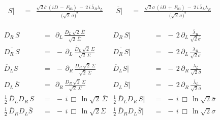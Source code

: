 \documentclass[14pt]{article}
\newcommand{\p}{\partial}
\newcommand{\ov}{\overline}
\begin{document}
\begin{align*}
	S \Big| &    ~~=~~    \frac{ \sqrt{2}\ov\sigma\, ( iD \,-\, F_{03} ) ~-~ 2\,i\, \ov\lambda{}_R \lambda_L }
						{ \big( \sqrt{2}\, \ov\sigma \big)^2 }
	\quad
	&
	\ov S \Big| &    ~~=~~    \frac{ \sqrt{2}\sigma\, ( iD \,+\, F_{03} ) ~-~ 2\,i\, \ov\lambda{}_L \lambda_R }
						{ \big( \sqrt{2}\, \sigma \big)^2 }
\end{align*}

\begin{align*}
%
	D_R\, S &    ~~=~~    \p_L\, \frac{ D_L\, \sqrt{2}\,\ov\Sigma}{\sqrt{2}\,\ov\Sigma}
	&
	D_R\, S \Big| &    ~~=~~    -\, 2\, \p_L\, \frac{\ov\lambda{}_R}{\sqrt{2}\ov\sigma}
	\\[2mm]
%
	\ov {D_R\, S} &    ~~=~~    -\, \p_L\, \frac{\ov D{}_L\, \sqrt{2}\,\Sigma}{\sqrt{2}\, \Sigma}
	&
	\ov {D_R\, S} \Big| &    ~~=~~    -\, 2\, \p_L\, \frac{\lambda_R}{\sqrt{2}\sigma}
	\\[2mm]
%
	\ov D{}_L S &    ~~=~~    -\, \p_R\, \frac{ \ov{D_R\, \sqrt{2}\, \Sigma} }{ \sqrt{2}\, \ov\Sigma }
	&
	\ov D{}_L S \Big| &    ~~=~~    -\, 2\, \p_R\, \frac{\lambda_L}{\sqrt{2}\ov\sigma}
	\\[2mm]
%
	D_L\, \ov S &    ~~=~~    \p_R\, \frac{D_R\, \sqrt{2}\, \Sigma}{\sqrt{2}\,\Sigma}
	&
	D_L\, \ov S \Big| &    ~~=~~    -\, 2\, \p_R\, \frac{\ov\lambda{}_L}{\sqrt{2}\sigma}
	\\[6mm]
%
	\frac{1}{2}\, \ov D{}_L D_R\, S &    ~~=~~    -\, i\, \Box\, \ln \sqrt{2}\, \ov\Sigma
	&
	\frac{1}{2}\, \ov D{}_L D_R\, S \Big| &    ~~=~~    -\, i\, \Box\, \ln \sqrt{2}\ov\sigma
	\\[2mm]
%
	\frac{1}{2}\, \ov D{}_R D_L \ov S &    ~~=~~    -\, i\, \Box\, \ln \sqrt{2}\Sigma
	&
	\frac{1}{2}\, \ov D{}_R D_L \ov S \Big| &    ~~=~~    -\, i\, \Box\, \ln \sqrt{2}\sigma
\end{align*}


\pagebreak
\end{document}

